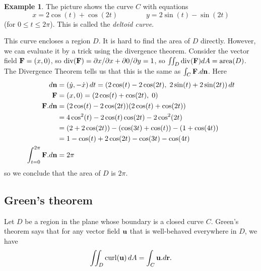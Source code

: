 \documentclass[reqno]{amsart}
\theoremstyle{definition}
\newtheorem{example}[theorem]{Example}
\begin{document}
\begin{example}\label{eg-deltoid}
 The picture shows the curve $C$ with equations
 \[
   x = 2\cos(t)+\cos(2t) \hspace{4em}
   y = 2\sin(t)-\sin(2t)
 \] 
 (for $0\leq t\leq 2\pi$).  This is called the \emph{deltoid curve}.
 \begin{center}
 \end{center}
 This curve encloses a region $D$.  It is hard to find the area of $D$
 directly.  However, we can evaluate it by a trick using the
 divergence theorem.  Consider the vector field $\mathbf{F}=(x,0)$, so
 $\operatorname{div}(\mathbf{F})=\partial x/\partial x+\partial 0/\partial y=1$, so
 $\iint_D\operatorname{div}(\mathbf{F})dA=\text{area}(D)$.  The Divergence Theorem tells us
 that this is the same as $\int_C\mathbf{F}.d\mathbf{n}$.  Here
 \begin{align*}
  d\mathbf{n} &= (\dot{y},-\dot{x})\,dt 
        = (2\cos(t)-2\cos(2t),\;2\sin(t)+2\sin(2t))\,dt \\
  \mathbf{F} &= (x,0) = (2\cos(t)+\cos(2t),\;0) \\
  \mathbf{F}.d\mathbf{n} &= (2\cos(t)-2\cos(2t))(2\cos(t)+\cos(2t)) \\
   &= 4\cos^2(t)-2\cos(t)\cos(2t)-2\cos^2(2t) \\
   &= (2+2\cos(2t))-(\cos(3t)+\cos(t))-(1+\cos(4t)) \\
   &= 1-\cos(t)+2\cos(2t)-\cos(3t)-\cos(4t) \\
   \int_{t=0}^{2\pi}\mathbf{F}.d\mathbf{n} &= 2\pi 
 \end{align*}
 so we conclude that the area of $D$ is $2\pi$.
\end{example}

\subsection{Green's theorem}

Let $D$ be a region in the plane whose boundary is a closed curve $C$.
Green's theorem says that for any vector field $\mathbf{u}$ that is
well-behaved everywhere in $D$, we have
\[ \iint_D \operatorname{curl}(\mathbf{u})\, dA = \int_C \mathbf{u}.d\mathbf{r}. \]
\end{document}
